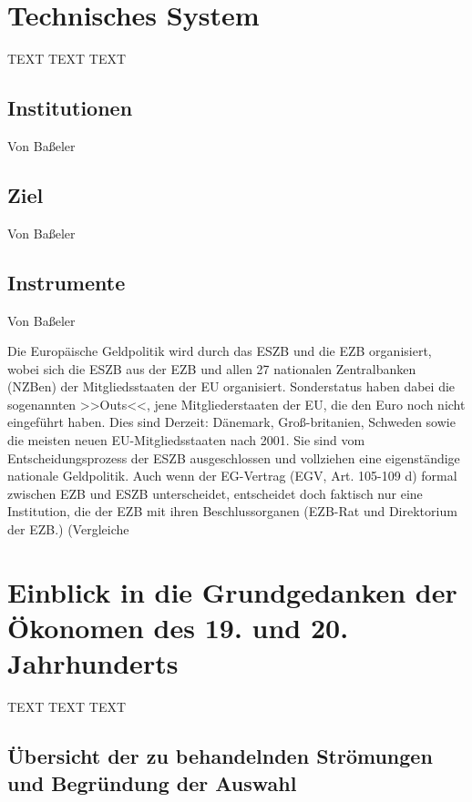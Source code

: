 \documentclass[
onecolumn,
a4paper,
abstracton,
parskip=half
,final
]{scrartcl}
\begin{document}
\clearpage

\section{Technisches System}
\label{sec2:technischesSystem}
TEXT TEXT TEXT
\subsection{Institutionen} Von Ba{\ss}eler
\subsection{Ziel}  Von Ba{\ss}eler
\subsection{Instrumente}  Von Ba{\ss}eler

Die Europ{\"a}ische Geldpolitik wird durch das \ac{ESZB} und die \ac{EZB} organisiert, wobei sich die \ac{ESZB} aus der \acf{EZB} und allen 27 nationalen Zentralbanken (NZBen) der Mitgliedsstaaten der \ac{EU} organisiert. Sonderstatus haben dabei die sogenannten >>Outs<<, jene Mitgliederstaaten der \ac{EU}, die den Euro noch nicht eingef{\"u}hrt haben. Dies sind Derzeit: D{\"a}nemark, Gro{\ss}-britanien, Schweden sowie die meisten neuen \acs{EU}-Mitgliedsstaaten nach 2001. Sie sind vom Entscheidungsprozess der \acs{ESZB} ausgeschlossen und vollziehen eine eigenst{\"a}ndige nationale Geldpolitik. Auch wenn der \acs{EG}-Vertrag (EGV, Art. 105-109 d) formal zwischen \ac{EZB} und \ac{ESZB} unterscheidet, entscheidet doch faktisch nur eine Institution, die der \ac{EZB} mit ihren Beschlussorganen (EZB-Rat und Direktorium der \ac{EZB}.) (Vergleiche



\clearpage





\section{Einblick in die Grundgedanken der {\"O}konomen des 19. und 20. Jahrhunderts}
\label{sec3:stroemungen}
TEXT TEXT TEXT


\subsection{{\"U}bersicht der zu behandelnden Str{\"o}mungen und Begr{\"u}ndung der Auswahl}
\end{document}
